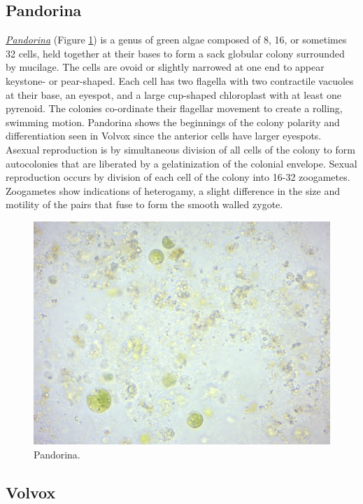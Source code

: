 \subsection{Pandorina}\label{pandorina}

\href{https://en.wikipedia.org/wiki/Pandorina}{\emph{Pandorina}} (Figure
\ref{fig:pandorina}) is a genus of green algae composed of 8, 16, or
sometimes 32 cells, held together at their bases to form a sack globular
colony surrounded by mucilage. The cells are ovoid or slightly narrowed
at one end to appear keystone- or pear-shaped. Each cell has two
flagella with two contractile vacuoles at their base, an eyespot, and a
large cup-shaped chloroplast with at least one pyrenoid. The colonies
co-ordinate their flagellar movement to create a rolling, swimming
motion. Pandorina shows the beginnings of the colony polarity and
differentiation seen in Volvox since the anterior cells have larger
eyespots. Asexual reproduction is by simultaneous division of all cells
of the colony to form autocolonies that are liberated by a
gelatinization of the colonial envelope. Sexual reproduction occurs by
division of each cell of the colony into 16-32 zoogametes. Zoogametes
show indications of heterogamy, a slight difference in the size and
motility of the pairs that fuse to form the smooth walled zygote.

\begin{figure}

{\centering \includegraphics[width=0.7\linewidth]{./figures/protists/Pandorina} 

}

\caption{Pandorina.}\label{fig:pandorina}
\end{figure}

\subsection{Volvox}\label{volvox}

